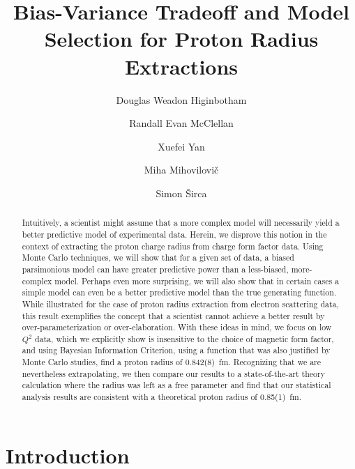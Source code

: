 \documentclass[10pt,aps,prc,twocolumn]{revtex4-1}
\begin{document}
\title{Bias-Variance Tradeoff and Model Selection for Proton Radius Extractions}

\author{Douglas Weadon Higinbotham}
\author{Randall Evan McClellan}

\author{Xuefei Yan}

\author{Miha Mihovilovi\v{c}}
\author{Simon \v{S}irca}

\begin{abstract}
Intuitively, a scientist might assume that a more complex model will necessarily yield a better
predictive model of experimental data.   Herein, we disprove this notion in the context of extracting 
the proton charge radius from charge form factor data.   Using Monte Carlo techniques, we will show that 
for a given set of data, a biased parsimonious model can have greater predictive power than a 
less-biased, more-complex model.  Perhaps even more surprising, we will also show that in certain cases a simple model 
can even be a better predictive model than the true generating function.   While illustrated for the case of proton
radius extraction from electron scattering data, this result exemplifies the concept that 
a scientist cannot achieve a better result by over-parameterization or over-elaboration. 
With these ideas in mind, we focus on low $Q^2$ data, which we explicitly show is insensitive to the choice of 
magnetic form factor, and using Bayesian Information Criterion, using a function that was also justified by Monte Carlo 
studies, find a proton radius of 0.842(8)~fm.    Recognizing that we are nevertheless extrapolating, 
we then compare our results to a state-of-the-art theory calculation where the radius was left as a free parameter
and find that our statistical analysis results are consistent with a theoretical proton radius of 0.85(1)~fm.   
\end{abstract}

\maketitle

\section{Introduction}
\end{document}
